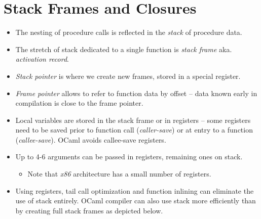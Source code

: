\documentclass{beamer}
\newcommand{\tmem}[1]{{\em #1\/}}
\begin{document}
\section{Stack Frames and Closures}

\begin{itemize}
  \item The nesting of procedure calls is reflected in the {\tmem{stack}} of
  procedure data.
  
  \item The stretch of stack dedicated to a single function is {\tmem{stack
  frame}} aka. {\tmem{activation record}}.
  
  \item {\tmem{Stack pointer}} is where we create new frames, stored in a
  special register.
  
  \item {\tmem{Frame pointer}} allows to refer to function data by offset --
  data known early in compilation is close to the frame pointer.
  
  \item Local variables are stored in the stack frame or in registers -- some
  regis{\nobreak}ters need to be saved prior to function call
  ({\tmem{caller-save}}) or at entry to a function ({\tmem{callee-save}}).
  OCaml avoids callee-save registers.
  
  \item Up to 4-6 arguments can be passed in registers, remaining ones on
  stack.
  \begin{itemize}
    \item Note that {\tmem{x86}} architecture has a small number of registers.
  \end{itemize}
  \item Using registers, tail call optimization and function inlining can
  eliminate the use of stack entirely. OCaml compiler can also use stack more
  efficiently than by creating full stack frames as depicted below.
  

\end{itemize}
\end{document}
